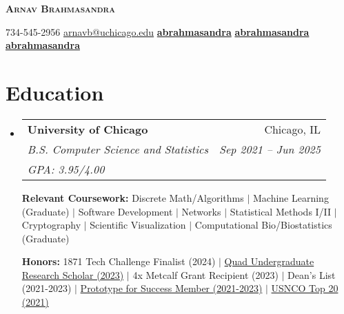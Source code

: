 \documentclass[letterpaper,11pt]{article}
\makeatletter
\newcommand{\phonesymbol}{\faPhone}
\newcommand{\homepagesymbol}{\faChain}
\newcommand{\linkedinsymbol}{\faLinkedin}
\newcommand{\githubsymbol}{\faGithub}
\newcommand{\mailsymbol}{\faEnvelope}
\newcommand{\printinfo}[2]{\mbox{{#1}\hspace{0.5em}#2\hspace{0.5em}}}
\newcommand{\mailaddress}[1]{\printinfo{\mailsymbol}{#1}}
\newcommand{\phone}[1]{\printinfo{\phonesymbol}{#1}}
\newcommand{\homepage}[1]{\printinfo{\homepagesymbol}{#1}}
\newcommand{\linkedin}[1]{\printinfo{\linkedinsymbol}{#1}}
\newcommand{\github}[1]{\printinfo{\githubsymbol}{#1}}
\newcommand{\courseItem}[1]{
    {\small #1 \vspace{-2pt}}
}
\newcommand{\honorsItem}[1]{
    {\small #1 \vspace{-2pt}}
}
\newcommand{\resumeEduSubheading}[5]{
  \vspace{-2pt}\item
    \begin{tabular*}{0.97\textwidth}[t]{l@{\extracolsep{\fill}}r}
      \textbf{#1} & #2 \\
      \textit{\small#3} & \textit{\small #4} \\
      \textit{\small#5}
    \end{tabular*}\vspace{-7pt}
}
\newcommand{\resumeSubHeadingListStart}{\begin{itemize}[leftmargin=0.15in, label={}]}
\newcommand{\resumeSubHeadingListEnd}{\end{itemize}}
\makeatother
\begin{document}

\begin{center}
    \textbf{\Huge \scshape Arnav Brahmasandra} \\ \vspace{1pt}
    
    \phone{734-545-2956} 
    \mailaddress{\href{mailto:arnavb@uchicago.edu}{arnavb@uchicago.edu}}
    \linkedin{\href{https://www.linkedin.com/in/abrahmasandra/}{\textbf{abrahmasandra}}}
    \github{\href{https://github.com/abrahmasandra}{\textbf{abrahmasandra}}}
    \homepage{\href{https://abrahmasandra.github.io/}{\textbf{abrahmasandra}}}
\end{center}


\section{Education}
  \resumeSubHeadingListStart
    \resumeEduSubheading
      {University of Chicago}{Chicago, IL}
      {B.S. Computer Science and Statistics}{Sep 2021 -- Jun 2025}{GPA: 3.95/4.00} \newline

    \textbf{Relevant Coursework:} \courseItem{Discrete Math/Algorithms $|$ Machine Learning (Graduate) $|$ Software Development $|$ Networks $|$ Statistical Methods I/II $|$ Cryptography $|$ Scientific Visualization $|$ Computational Bio/Biostatistics (Graduate)}
    
    \textbf{Honors:} \honorsItem{1871 Tech Challenge Finalist (2024) $|$ \href{https://ugradresearchsymposium.omeka.net/items/show/120}{Quad Undergraduate Research Scholar (2023)} $|$ 4x Metcalf Grant Recipient (2023) $|$ Dean's List (2021-2023) $|$ \href{https://careeradvancement.uchicago.edu/careers-in/engineering/prototype-for-success/class-of-2025}{Prototype for Success Member (2021-2023)} $|$ \href{https://www.acs.org/content/acs/en/pressroom/newsreleases/2021/may/2021-chemistry-olympiad-virtual-study-camp-students-named.html}{USNCO Top 20 (2021)}}
  \resumeSubHeadingListEnd
\end{document}
